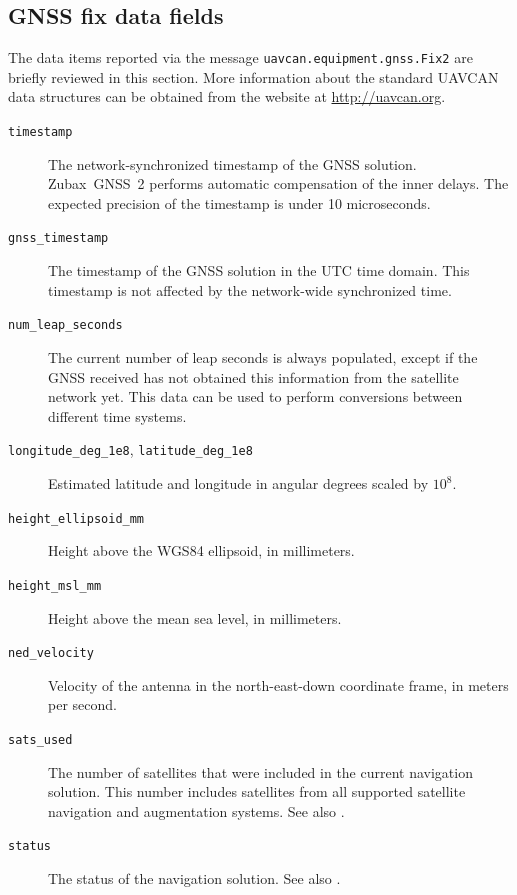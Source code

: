 \documentclass{zubaxdoc}
\begin{document}
\subsection{GNSS fix data fields}

The data items reported via the message \verb|uavcan.equipment.gnss.Fix2| are briefly reviewed in this section.
More information about the standard UAVCAN data structures can be obtained from the website at
\url{http://uavcan.org}.

\begin{description}
    \item[\texttt{timestamp}] The network-synchronized timestamp of the GNSS solution.
    Zubax~GNSS~2 performs automatic compensation of the inner delays.
    The expected precision of the timestamp is under 10 microseconds.

    \item[\texttt{gnss\_timestamp}] The timestamp of the GNSS solution in the UTC time domain.
    This timestamp is not affected by the network-wide synchronized time.

    \item[\texttt{num\_leap\_seconds}] The current number of leap seconds is always populated,
    except if the GNSS received has not obtained this information from the satellite network yet.
    This data can be used to perform conversions between different time systems.

    \item[\texttt{longitude\_deg\_1e8}, \texttt{latitude\_deg\_1e8}] Estimated latitude and longitude
    in angular degrees scaled by $10^8$.

    \item[\texttt{height\_ellipsoid\_mm}] Height above the WGS84 ellipsoid, in millimeters.

    \item[\texttt{height\_msl\_mm}] Height above the mean sea level, in millimeters.

    \item[\texttt{ned\_velocity}] Velocity of the antenna in the north-east-down coordinate frame,
    in meters per second.
    
    \item[\texttt{sats\_used}] The number of satellites that were included in the current navigation solution.
    This number includes satellites from all supported satellite navigation and augmentation systems.
    See also .
    
    \item[\texttt{status}] The status of the navigation solution.
    See also .
    

\end{description}
\end{document}
